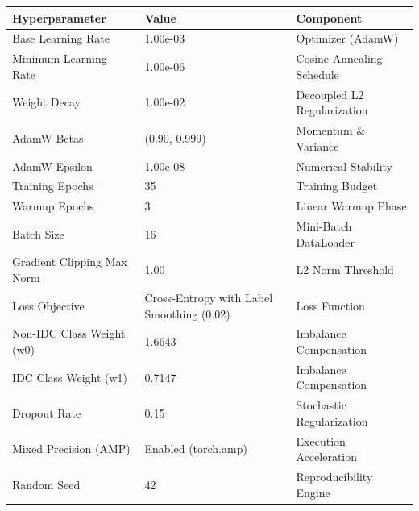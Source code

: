 \begin{tabular}{lll}
\toprule
Hyperparameter & Value & Component \\
\midrule
Base Learning Rate & 1.00e-03 & Optimizer (AdamW) \\
Minimum Learning Rate & 1.00e-06 & Cosine Annealing Schedule \\
Weight Decay & 1.00e-02 & Decoupled L2 Regularization \\
AdamW Betas & (0.90, 0.999) & Momentum \& Variance \\
AdamW Epsilon & 1.00e-08 & Numerical Stability \\
Training Epochs & 35 & Training Budget \\
Warmup Epochs & 3 & Linear Warmup Phase \\
Batch Size & 16 & Mini-Batch DataLoader \\
Gradient Clipping Max Norm & 1.00 & L2 Norm Threshold \\
Loss Objective & Cross-Entropy with Label Smoothing (0.02) & Loss Function \\
Non-IDC Class Weight (w0) & 1.6643 & Imbalance Compensation \\
IDC Class Weight (w1) & 0.7147 & Imbalance Compensation \\
Dropout Rate & 0.15 & Stochastic Regularization \\
Mixed Precision (AMP) & Enabled (torch.amp) & Execution Acceleration \\
Random Seed & 42 & Reproducibility Engine \\
\bottomrule
\end{tabular}
